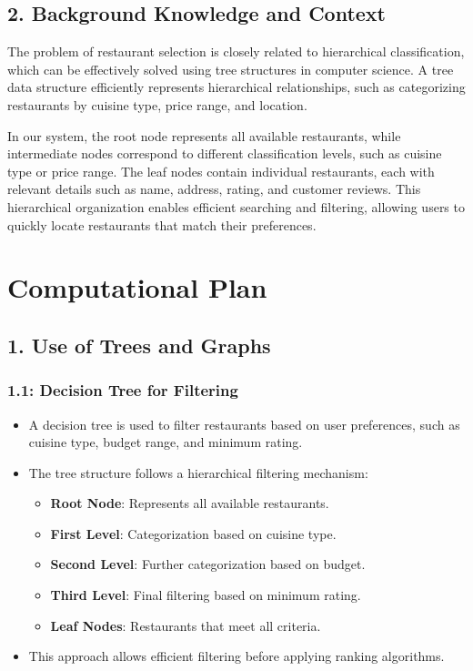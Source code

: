 \documentclass[fontsize=11pt]{article}
\begin{document}
\subsection*{2. Background Knowledge and Context}
The problem of restaurant selection is closely related to hierarchical classification, which can be effectively solved using tree structures in computer science. A tree data structure efficiently represents hierarchical relationships, such as categorizing restaurants by cuisine type, price range, and location. 

In our system, the root node represents all available restaurants, while intermediate nodes correspond to different classification levels, such as cuisine type or price range. The leaf nodes contain individual restaurants, each with relevant details such as name, address, rating, and customer reviews. This hierarchical organization enables efficient searching and filtering, allowing users to quickly locate restaurants that match their preferences.


\section*{Computational Plan}

\subsection*{1. Use of Trees and Graphs}

\subsubsection*{1.1: Decision Tree for Filtering}
\begin{itemize}
    \item A decision tree is used to filter restaurants based on user preferences, such as cuisine type, budget range, and minimum rating.
    \item The tree structure follows a hierarchical filtering mechanism: 
    \begin{itemize}
        \item \textbf{Root Node}: Represents all available restaurants.
        \item \textbf{First Level}: Categorization based on cuisine type.
        \item \textbf{Second Level}: Further categorization based on budget.
        \item \textbf{Third Level}: Final filtering based on minimum rating.
        \item \textbf{Leaf Nodes}: Restaurants that meet all criteria.
    \end{itemize}
    \item This approach allows efficient filtering before applying ranking algorithms.
\end{itemize}
\end{document}
